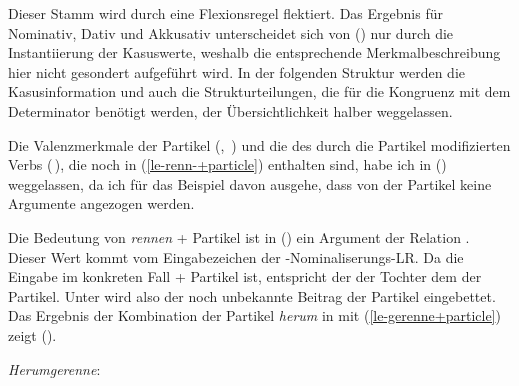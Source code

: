 \noindent
Dieser Stamm wird durch eine Flexionsregel flektiert. Das Ergebnis 
für Nominativ, Dativ und Akkusativ unterscheidet
sich von () nur durch die Instantiierung der Kasuswerte, weshalb
die entsprechende Merkmalbeschreibung hier nicht gesondert aufgeführt wird.
In der folgenden Struktur werden die Kasusinformation und auch die Strukturteilungen,
die für die Kongruenz mit dem Determinator benötigt werden, der Übersichtlichkeit
halber weggelassen.

Die Valenzmerkmale der Partikel (\subj {}, \comps {}\,) und die \argst des durch die
Partikel modifizierten Verbs (\argst {}\,), die noch in (\ref{le-renn-+particle}) enthalten sind, habe ich
in () weggelassen, da ich für das Beispiel davon ausgehe, dass von der Partikel keine
Argumente angezogen werden.

Die Bedeutung von \emph{rennen} + Partikel ist in () ein Argument der
Relation  . Dieser Wert kommt vom Eingabezeichen der
\gee-Nominaliserungs-LR. Da die Eingabe im konkreten Fall  + Partikel ist, entspricht der
\contw der Tochter dem \contw der Partikel. Unter  wird also der
noch unbekannte Beitrag der Partikel eingebettet. Das Ergebnis der Kombination der Partikel \emph{herum} in 
mit (\ref{le-gerenne+particle}) zeigt ().

\eas
\label{fs-Herumgerenne}%
\emph{Herumgerenne}:\\
\zs

